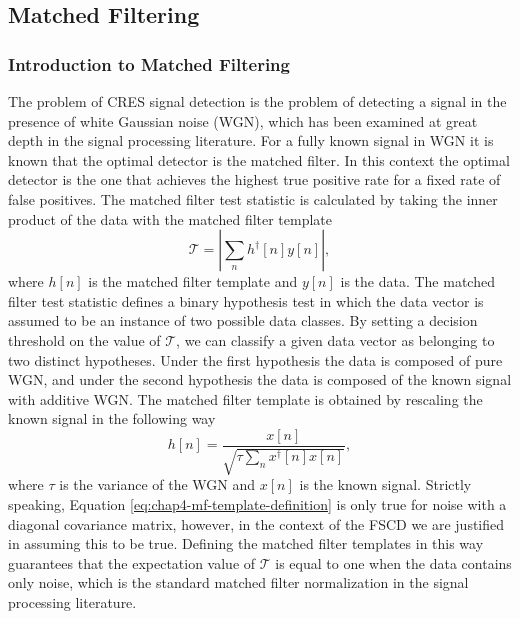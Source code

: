 \subsection{Matched Filtering}

\subsubsection*{Introduction to Matched Filtering}

The problem of CRES signal detection is the problem of detecting a signal in the presence of white Gaussian noise (WGN), which has been examined at great depth in the signal processing literature. For a fully known signal in WGN it is known that the optimal detector is the matched filter. In this context the optimal detector is the one that achieves the highest true positive rate for a fixed rate of false positives. The matched filter test statistic is calculated by taking the inner product of the data with the matched filter template
\begin{equation}
    \mathcal{T}=\left|\sum_{n}{h^\dagger[n]y[n]}\right|,
    \label{eq:chap4-mf-test-stat-perfect}
\end{equation}
where $h[n]$ is the matched filter template and $y[n]$ is the data. The matched filter test statistic defines a binary hypothesis test in which the data vector is assumed to be an instance of two possible data classes. By setting a decision threshold on the value of $\mathcal{T}$, we can classify a given data vector as belonging to two distinct hypotheses. Under the first hypothesis the data is composed of pure WGN, and under the second hypothesis the data is composed of the known signal with additive WGN. The matched filter template is obtained by rescaling the known signal in the following way
\begin{equation}
    h[n] = \frac{x[n]}{\sqrt{\tau \sum_{n}{x^\dagger[n]x[n]}}},
    \label{eq:chap4-mf-template-definition}
\end{equation}
where $\tau$ is the variance of the WGN and $x[n]$ is the known signal. Strictly speaking, Equation \ref{eq:chap4-mf-template-definition} is only true for noise with a diagonal covariance matrix, however, in the context of the FSCD we are justified in assuming this to be true. Defining the matched filter templates in this way guarantees that the expectation value of $\mathcal{T}$ is equal to one when the data contains only noise, which is the standard matched filter normalization in the signal processing literature.

